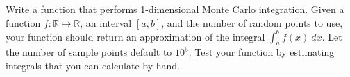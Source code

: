 \begin{problem}
\label{prob:mc_1d}
Write a function that performs 1-dimensional Monte Carlo integration.
Given a function $f: \mathbb{R} \mapsto \mathbb{R}$, an interval ${[a,b]}$, and the number of random points to use, your function should return an approximation of the integral
$\int_a^b f(x)\:dx$.
Let the number of sample points default to $10^5$.
Test your function by estimating integrals that you can calculate by hand.

\end{problem}

